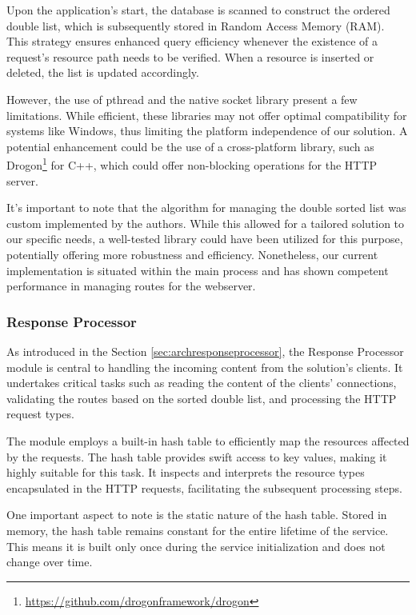 \documentclass[a4paper,fleqn]{cas-dc}
\begin{document}
Upon the application's start, the database is scanned to construct the ordered double list, which is subsequently stored in Random Access Memory (RAM). This strategy ensures enhanced query efficiency whenever the existence of a request's resource path needs to be verified. When a resource is inserted or deleted, the list is updated accordingly.

However, the use of pthread and the native socket library present a few limitations. While efficient, these libraries may not offer optimal compatibility for systems like Windows, thus limiting the platform independence of our solution. A potential enhancement could be the use of a cross-platform library, such as Drogon\footnote{\url{https://github.com/drogonframework/drogon}} for C++, which could offer non-blocking operations for the HTTP server.

It's important to note that the algorithm for managing the double sorted list was custom implemented by the authors. While this allowed for a tailored solution to our specific needs, a well-tested library could have been utilized for this purpose, potentially offering more robustness and efficiency. Nonetheless, our current implementation is situated within the main process and has shown competent performance in managing routes for the webserver.

\subsubsection{Response Processor}

As introduced in the Section \ref{sec:archresponseprocessor}, the Response Processor module is central to handling the incoming content from the solution's clients. It undertakes critical tasks such as reading the content of the clients' connections, validating the routes based on the sorted double list, and processing the HTTP request types.

The module employs a built-in hash table to efficiently map the resources affected by the requests. The hash table provides swift access to key values, making it highly suitable for this task. It inspects and interprets the resource types encapsulated in the HTTP requests, facilitating the subsequent processing steps.

One important aspect to note is the static nature of the hash table. Stored in memory, the hash table remains constant for the entire lifetime of the service. This means it is built only once during the service initialization and does not change over time.
\end{document}
